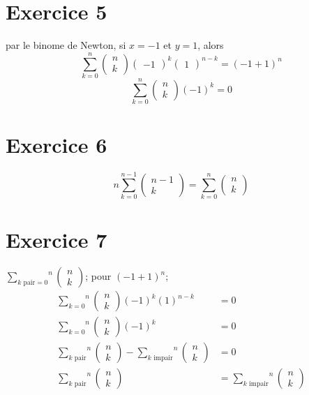 \documentclass[fontsize=10pt]{article}
\begin{document}
\section*{Exercice 5}
par le binome de Newton, si $x=-1$ et $y=1$, alors
$$ \underset{k=0}{\overset{n}{\sum}}
\begin{pmatrix} 
n\\
k
\end{pmatrix}
\begin{pmatrix} 
-1
\end{pmatrix}^k
\begin{pmatrix} 
1
\end{pmatrix}^{n-k} = (-1+1)^n$$
$$ \underset{k=0}{\overset{n}{\sum}}
\begin{pmatrix} 
n\\
k
\end{pmatrix}
(-1)^k = 0
$$
\section*{Exercice 6}
$$ n\underset{k=0}{\overset{n-1}{\sum}}
\begin{pmatrix} 
n-1\\
k
\end{pmatrix}
= \underset{k=0}{\overset{n}{\sum}}
\begin{pmatrix} 
n\\
k
\end{pmatrix}$$
\section*{Exercice 7}
$\overset{n}{\underset{k \text{ pair} = 0}{\sum}}
\begin{pmatrix} 
n\\
k
\end{pmatrix}$; pour $(-1+1)^n$;
\begin{align*}
\overset{n}{\underset{k= 0}{\sum}}
\begin{pmatrix} 
n\\
k
\end{pmatrix}(-1)^k(1)^{n-k} &= 0\\
\overset{n}{\underset{k= 0}{\sum}}
\begin{pmatrix} 
n\\
k
\end{pmatrix}(-1)^k &=0\\
\overset{n}{\underset{k \text{ pair}}{\sum}}
\begin{pmatrix} 
n\\
k
\end{pmatrix}
-
\overset{n}{\underset{k\text{ impair}}{\sum}}
\begin{pmatrix} 
n\\
k
\end{pmatrix} &=0\\
\overset{n}{\underset{k \text{ pair}}{\sum}}
\begin{pmatrix} 
n\\
k
\end{pmatrix}
&=
\overset{n}{\underset{k\text{ impair}}{\sum}}
\begin{pmatrix} 
n\\
k
\end{pmatrix}
\end{align*}
\end{document}
